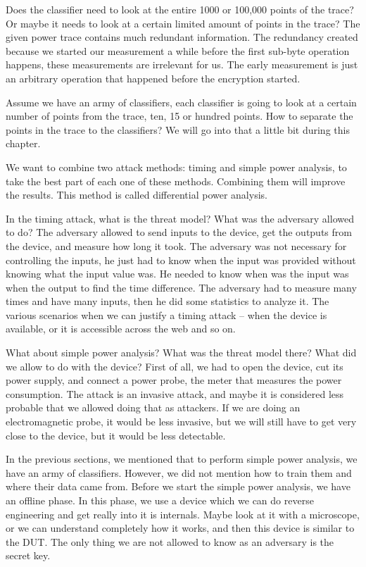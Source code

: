 Does the classifier need to look at the entire 1000 or 100,000 points of the trace?
Or maybe it needs to look at a certain limited amount of points in the trace?
The given power trace contains much redundant information.
The redundancy created because we started our measurement a while before the first sub-byte operation happens, these measurements are irrelevant for us.
The early measurement is just an arbitrary operation that happened before the encryption started.

Assume we have an army of classifiers, each classifier is going to look at a certain number of points from the trace, ten, 15 or hundred points.
How to separate the points in the trace to the classifiers?
We will go into that a little bit during this chapter. 

We want to combine two attack methods: timing and simple power analysis, to take the best part of each one of these methods.
Combining them will improve the results.
This method is called differential power analysis.

In the timing attack, what is the threat model? 
What was the adversary allowed to do? 
The adversary allowed to send inputs to the device, 
get the outputs from the device, 
and measure how long it took.
The adversary was not necessary for controlling the inputs, 
he just had to know when the input was provided without knowing what the input value was.
He needed to know when was the input was when the output to find the time difference. 
The adversary had to measure many times and have many inputs, 
then he did some statistics to analyze it.
The various scenarios when we can justify a timing attack – when the device is available, or it is accessible across the web and so on.

What about simple power analysis? 
What was the threat model there? 
What did we allow to do with the device? 
First of all, we had to open the device, cut its power supply, and connect a power probe, the meter that measures the power consumption.
The attack is an invasive attack, and maybe it is considered less probable that we allowed doing that as attackers. 
If we are doing an electromagnetic probe, it would be less invasive, but we will still have to get very close to the device, but it would be less detectable. 

In the previous sections, we mentioned that to perform simple power analysis, we have an army of classifiers.
However, we did not mention how to train them and where their data came from.
Before we start the simple power analysis, we have an offline phase.
In this phase, we use a device which we can do reverse engineering and get really into it is internals. 
Maybe look at it with a microscope, or we can understand completely how it works, and then this device is similar to the DUT. 
The only thing we are not allowed to know as an adversary is the secret key.

